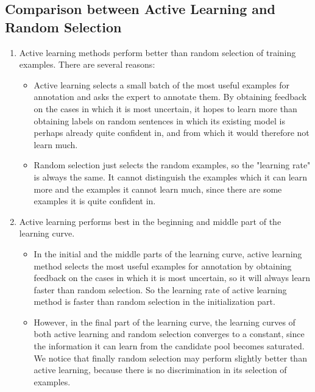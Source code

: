\documentclass[winfonts,UTF8]{article}
\begin{document}
\subsection{Comparison between Active Learning and Random Selection}
\begin{enumerate}
\item Active learning methods perform better than random selection of training examples.
There are several reasons: \\
\begin{itemize}
\item Active learning selects a small batch of the most useful examples for annotation and asks the expert to annotate them. By obtaining feedback on the cases in which it is most uncertain, it hopes to learn more than obtaining labels on random sentences in which its existing model is perhaps already quite confident in, and from which it would therefore not learn much.
\item Random selection just selects the random examples, so the "learning rate" is always the same. It cannot distinguish the examples which it can learn more and the examples it cannot learn much, since there are some examples it is quite confident in.
\end{itemize}
\item Active learning performs best in the beginning and middle part of the learning curve.
\begin{itemize}
\item In the initial and the middle parts of the learning curve, active learning method selects the most useful examples for annotation by obtaining feedback on the cases in which it is most uncertain, so it will always learn faster than random selection. So the learning rate of active learning method is faster than random selection in the initialization part.

\item However, in the final part of the learning curve, the learning curves of both active learning and random selection converges to a constant, since the information it can learn from the candidate pool becomes saturated. We notice that finally random selection may perform slightly better than active learning, because there is no discrimination in its selection of examples.
\end{itemize}
\end{enumerate}
\end{document}

